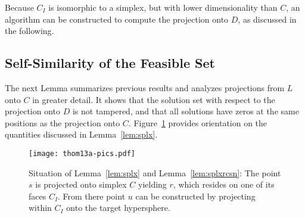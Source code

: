 \documentclass[twoside,11pt]{article}
\newcommand{\0}{\mathcal{O}}
\begin{document}
Because $C_I$ is isomorphic to a simplex, but with lower dimensionality than $C$, an algorithm can be constructed to compute the projection onto $D$, as discussed in the following.

\subsection{Self-Similarity of the Feasible Set}
\label{sect:selfsim_rec}
The next Lemma summarizes previous results and analyzes projections from $L$ onto $C$ in greater detail.
It shows that the solution set with respect to the projection onto $D$ is not tampered, and that all solutions have zeros  at the same positions as the projection onto $C$.
Figure~\ref{fig:simplex_proj_rec} provides orientation on the quantities discussed in Lemma~\ref{lem:splx}.

\begin{figure}[t]
  \centering
  \texttt{[image: thom13a-pics.pdf]}
  \caption{Situation of Lemma~\ref{lem:splx} and Lemma~\ref{lem:splxrcsn}: The point $s$ is projected onto simplex $C$ yielding $r$, which resides on one of its faces $C_I$. From there point $u$ can be constructed by projecting within $C_I$ onto the target hypersphere.}
  \label{fig:simplex_proj_rec}
\end{figure}
\end{document}
